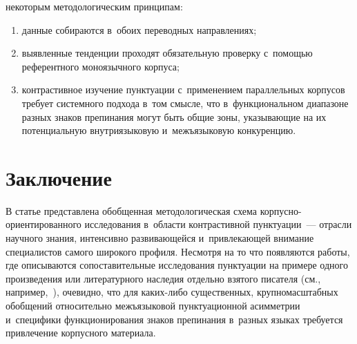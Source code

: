 \begin{multicols}{2}
некоторым методологическим принципам: %
\begin{enumerate}[(1)]
\item данные собираются в~обоих 
переводных на\-прав\-ле\-ни\-ях; %
\item выявленные тенденции проходят 
обязательную проверку с~по\-мощью референтного моноязычного корпуса; %
\item контрастивное изуче\-ние пунктуации с~применением параллельных 
корпусов требует сис\-тем\-но\-го подхода в~том смыс\-ле, что в~функциональном 
диапазоне разных знаков препинания могут быть общие зоны, ука\-зы\-ва\-ющие 
на их потенциальную внут\-ри\-язы\-ко\-вую и~межъ\-язы\-ко\-вую конкуренцию. %
\end{enumerate}
    
 \vspace*{-12pt}
 
    \section{Заключение}
    
    \vspace*{-3pt}
    
  В статье представлена обобщенная методологическая схема 
  кор\-пус\-но-ори\-ен\-ти\-ро\-ван\-но\-го 
  исследования в~об\-ласти контрастивной пунктуации~--- 
от\-расли научного знания, интенсивно \mbox{раз\-ви\-ва\-ющей\-ся} и~при\-вле\-ка\-ющей 
внимание специалистов самого широкого профиля. Несмотря на то что 
появляются работы, где описываются сопоставительные исследования 
пунктуации на примере одного произведения или литературного наследия 
отдельно взятого писателя (см., например,~\cite{16-nu,17-nu}), очевидно, что 
для ка\-ких-ли\-бо существенных, круп\-но\-мас\-штаб\-ных обобщений относительно 
межъязыковой пунктуационной асимметрии и~специфики функционирования 
знаков препинания в~разных языках требуется привлечение корпусного 
материала.
  

\end{multicols}
